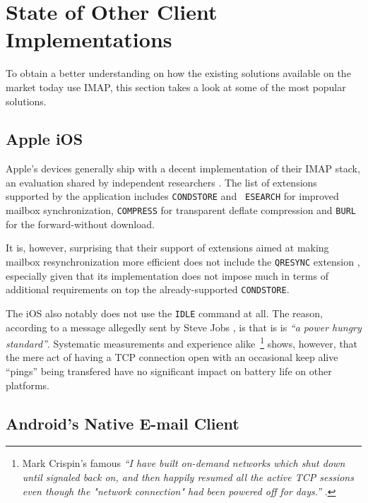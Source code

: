 \documentclass[trojita]{subfiles}
\begin{document}
\section{State of Other Client Implementations}

To obtain a better understanding on how the existing solutions available on the market today use IMAP, this section
takes a look at some of the most popular solutions.

\subsection{Apple iOS}

Apple's devices generally ship with a decent implementation of their IMAP stack, an evaluation shared by independent
researchers \cite{isode-iphone4}.  The list of extensions supported by the application includes {\tt CONDSTORE} and {\tt
ESEARCH} for improved mailbox synchronization, {\tt COMPRESS} for transparent deflate compression and {\tt BURL} for the
forward-without download.

It is, however, surprising that their support of extensions aimed at making mailbox resynchronization more efficient
does not include the {\tt QRESYNC} extension \cite{rfc5162}, especially given that its implementation does not impose
much in terms of additional requirements on top the already-supported {\tt CONDSTORE}.

The iOS also notably does not use the {\tt IDLE} command at all.  The reason, according to a message allegedly sent by
Steve Jobs \cite{jobs-ios-idle}, is that is is {\em ``a power hungry standard''}.  Systematic measurements
\cite{wcdma-energy} \cite{cridland-fach-dch-measurements} and experience alike~\footnote{Mark Crispin's famous {\em ``I
have built on-demand networks which shut down until signaled back on, and then happily resumed all the active TCP
sessions even though the "network connection" had been powered off for days.''} \cite{crispin-no-ifup}.} shows, however,
that the mere act of having a TCP connection open with an occasional keep alive ``pings'' being transfered have no
significant impact on battery life on other platforms.

\subsection{Android's Native E-mail Client}
\end{document}
